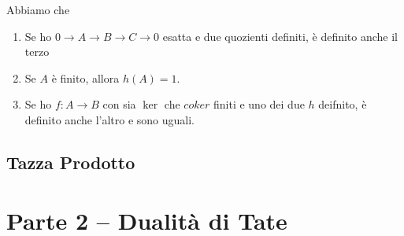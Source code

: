 \documentclass[a4paper]{article}
\begin{document}
	\begin{theorem}
		Abbiamo che
		\begin{enumerate}
			\item Se ho $ 0 \to A \to B \to C \to 0 $ esatta e due quozienti definiti, è definito anche il terzo
			\item Se $ A $ è finito, allora $ h(A) = 1 $.
			\item Se ho $ f \colon A \to B $ con sia $ \ker $ che $ coker$ finiti e uno dei due $ h $ deifnito, è definito anche l'altro e sono uguali.
		\end{enumerate}
	\end{theorem}

	\subsection{Tazza Prodotto}
	
	\newpage
	\section{ Parte 2 -- Dualità di Tate}
	
\end{document}
